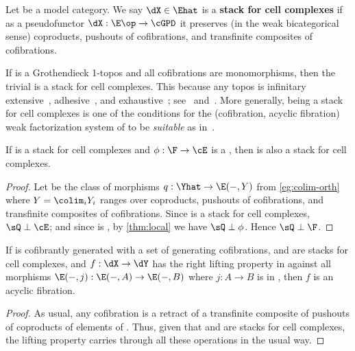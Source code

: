 \begin{defn}
  Let \E be a model category.
  We say $\dX\in\Ehat$ is a \textbf{stack for cell complexes} if as a pseudofunctor $\dX:\E\op\to\cGPD$ it preserves (in the weak bicategorical sense) coproducts, pushouts of cofibrations, and transfinite composites of cofibrations.
\end{defn}

\begin{eg}\label{eg:topos-stack}
  If \E is a Grothendieck 1-topos and all cofibrations are monomorphisms, then the trivial \nfs \cE is a stack for cell complexes.
  This because any topos is infinitary extensive~\cite{clw:ext-dist}, adhesive~\cite{ls:adhesive,ls:topadh}, and exhaustive~\cite{nlab:exhaustive,shulman:elreedy}; see~\cite[]{shulman:elreedy} and~\cite[Lemma 7.5]{sattler:eqvext}.
  More generally,
  \cE being a stack for cell complexes is one of the conditions for the (cofibration, acyclic fibration) weak factorization system of \E to be \emph{suitable} as in~\cite[Definition 3.2]{sattler:eqvext}.
\end{eg}

\begin{lem}\label{thm:nfs-stack}
  If \cE is a stack for cell complexes and $\phi:\F\to\cE$ is a \local \nfs, then \F is also a stack for cell complexes.
\end{lem}
\begin{proof}
  Let \sQ be the class of morphisms $q:\Yhat \to \E(-,Y)$ from \cref{eg:colim-orth} where $Y= \colim_i Y_i$ ranges over coproducts, pushouts of cofibrations, and transfinite composites of cofibrations.
  Since \cE is a stack for cell complexes, $\sQ \perp \cE$; and since \F is \local, by \cref{thm:local} we have $\sQ\perp\phi$.
  Hence $\sQ\perp \F$.
\end{proof}

\begin{lem}\label{thm:icell-acyc}
  If \E is cofibrantly generated with \cI a set of generating cofibrations, \dX and \dY are stacks for cell complexes, and $f:\dX\to\dY$ has the right lifting property in \Ehat against all morphisms $\E(-,j):\E(-,A)\to\E(-,B)$ where $j:A\to B$ is in \cI, then $f$ is an acyclic fibration.
\end{lem}
\begin{proof}
  As usual, any cofibration is a retract of a transfinite composite of pushouts of coproducts of elements of \cI.
  Thus, given that \dX and \dY are stacks for cell complexes, the lifting property carries through all these operations in the usual way.
\end{proof}

